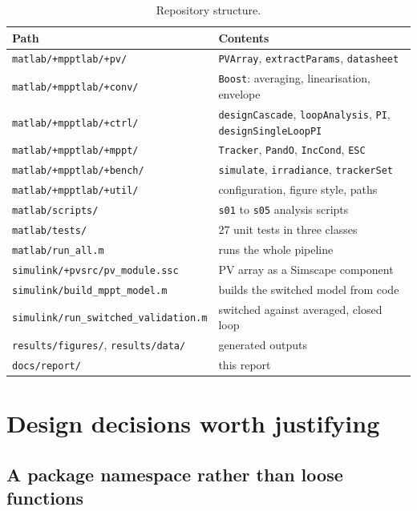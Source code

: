 \begin{table}[htbp]
\centering
\caption{Repository structure.}
\label{tab:repo}
\footnotesize
\begin{tabular}{@{}L{0.45\textwidth}L{0.47\textwidth}@{}}
\toprule
\textbf{Path} & \textbf{Contents} \\
\midrule
\texttt{matlab/+mpptlab/+pv/} & \texttt{PVArray}, \texttt{extractParams}, \texttt{datasheet} \\
\texttt{matlab/+mpptlab/+conv/} & \texttt{Boost}: averaging, linearisation, envelope \\
\texttt{matlab/+mpptlab/+ctrl/} & \texttt{designCascade}, \texttt{loopAnalysis}, \texttt{PI}, \texttt{designSingleLoopPI} \\
\texttt{matlab/+mpptlab/+mppt/} & \texttt{Tracker}, \texttt{PandO}, \texttt{IncCond}, \texttt{ESC} \\
\texttt{matlab/+mpptlab/+bench/} & \texttt{simulate}, \texttt{irradiance}, \texttt{trackerSet} \\
\texttt{matlab/+mpptlab/+util/} & configuration, figure style, paths \\
\texttt{matlab/scripts/} & \texttt{s01} to \texttt{s05} analysis scripts \\
\texttt{matlab/tests/} & 27 unit tests in three classes \\
\texttt{matlab/run\_all.m} & runs the whole pipeline \\
\texttt{simulink/+pvsrc/pv\_module.ssc} & PV array as a Simscape component \\
\texttt{simulink/build\_mppt\_model.m} & builds the switched model from code \\
\texttt{simulink/run\_switched\_validation.m} & switched against averaged, closed loop \\
\texttt{results/figures/}, \texttt{results/data/} & generated outputs \\
\texttt{docs/report/} & this report \\
\bottomrule
\end{tabular}
\end{table}

\section{Design decisions worth justifying}

\subsection{A package namespace rather than loose functions}

